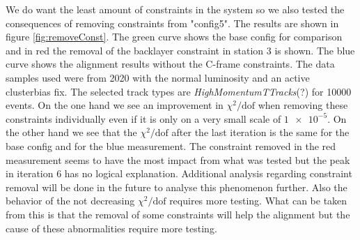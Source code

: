 We do want the least amount of constraints in the system so we also tested
the consequences of removing constraints from "config5".
The results are shown in figure \ref{fig:removeConst}.
The green curve shows the base config for comparison and in red the removal of the backlayer constraint in station 3 is shown. The blue curve shows the alignment results without the C-frame constraints.
The data samples used were from 2020 with the normal luminosity and an active clusterbias fix.
The selected track types are \textit{HighMomentumTTracks}(?) for 10000 events.
On the one hand we see an improvement in $\chi^2 / \text{dof}$ when removing these constraints individually even if it is only on a very small scale of $\num{1e-5}$. On the
other hand we see that the $\chi^2 / \text{dof}$ after the last iteration is the same for the base config and for the blue measurement. The constraint removed in the red measurement seems to have the most impact from what was tested but the peak in iteration 6 has no logical explanation. Additional analysis regarding constraint removal will be done in the future to analyse this phenomenon further.
Also the behavior of the not decreasing $\chi^2 / \text{dof}$ requires more testing.
What can be taken from this is that the removal of some constraints will help
the alignment but the cause of these abnormalities require more testing.
